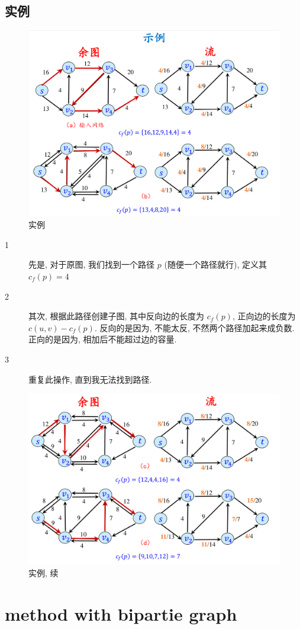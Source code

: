\documentclass[a4paper, 10pt]{ctexart} %
\begin{document}
\subsection{实例}
\begin{figure}[H]
    \centering
    \includegraphics[scale =0.5]{mf1.png}
    \caption{实例}
    \label{fig:2}
\end{figure}
\begin{description}
    \item[1] 先是, 对于原图, 我们找到一个路径 $p$ (随便一个路径就行), 定义其 $c_{f} \left(p\right) = 4$
    \item[2] 其次, 根据此路径创建子图, 其中反向边的长度为 $c_{f} \left(p\right)$, 正向边的长度为 $c \left( u , v\right) - c_{f} \left(p\right)$. 
    反向的是因为, 不能太反, 不然两个路径加起来成负数. 正向的是因为, 相加后不能超过边的容量. 
    \item[3] 重复此操作, 直到我无法找到路径. 
\end{description}

\begin{figure}[H]
    \centering
    \includegraphics[scale = 0.5]{mf2.png}
    \caption{实例, 续}
    \label{fig:3}
\end{figure}
\section{method with bipartie graph}
\end{document}
